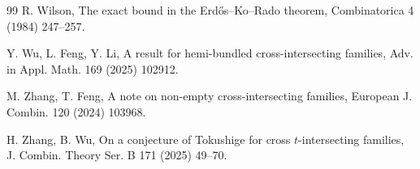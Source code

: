 \documentclass[11pt,a4paper]{article}
\begin{document}
\begin{thebibliography}{99}
R. Wilson, The exact bound in the Erd\H{o}s--Ko--Rado theorem, Combinatorica 4 (1984) 247--257.

Y. Wu, L. Feng, Y. Li, 
A result for hemi-bundled cross-intersecting families, 
Adv. in Appl. Math. 169 (2025) 102912. 


M. Zhang, T. Feng, 
A note on non-empty cross-intersecting families, 
European J. Combin. 120 (2024) 103968.

H. Zhang, B. Wu, On a conjecture of Tokushige for cross $t$-intersecting families, 
J. Combin. Theory Ser. B 171 (2025) 49--70. 



\end{thebibliography}
\end{document}
